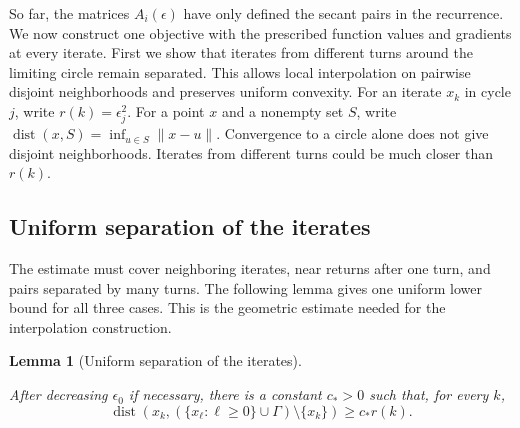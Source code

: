 \documentclass[11pt]{article}
\newtheorem{lemma}[theorem]{Lemma}
\begin{document}
So far, the matrices $A_i(\epsilon)$ have only defined the secant pairs in the
recurrence.  We now construct one objective with the prescribed function
values and gradients at every iterate.  First we show that iterates from
different turns around the limiting circle remain separated.  This allows
local interpolation on pairwise disjoint neighborhoods and preserves uniform
convexity.  For an iterate $x_k$ in cycle $j$, write $r(k)=\epsilon_j^2$.
For a point $x$ and a nonempty set $S$, write
$\operatorname{dist}(x,S)=\inf_{u\in S}\|x-u\|$.
Convergence to a circle alone does not give disjoint neighborhoods.  Iterates
from different turns could be much closer than $r(k)$.

\subsection{Uniform separation of the iterates}

The estimate must cover neighboring iterates, near returns after one turn, and
pairs separated by many turns.  The following lemma gives one uniform lower
bound for all three cases.  This is the geometric estimate needed for the
interpolation construction.

\begin{lemma}[Uniform separation of the iterates]\label{lem:separation}



After decreasing $\epsilon_0$ if necessary, there is a constant $c_*>0$ such
that, for every $k$,
\begin{equation}\label{eq:separation}
\operatorname{dist}\!\left(
x_k,(\{x_\ell:\ell\ge0\}\cup\Gamma)\setminus\{x_k\}
\right)
\ge c_*r(k).
\end{equation}
\end{lemma}
\end{document}
